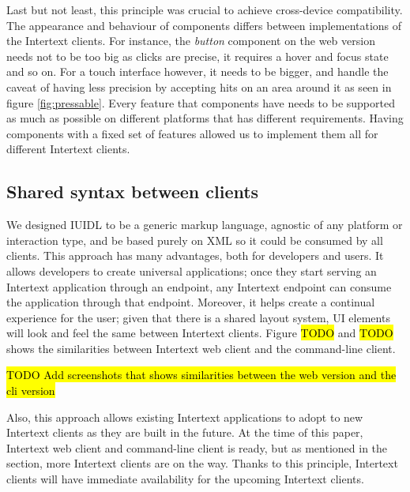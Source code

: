Last but not least, this principle was crucial to achieve cross-device compatibility. The appearance and behaviour of components differs between implementations of the Intertext clients. For instance, the \textit{button} component on the web version needs not to be too big as clicks are precise, it requires a hover and focus state and so on. For a touch interface however, it needs to be bigger, and handle the caveat of having less precision by accepting hits on an area around it as seen in figure \ref{fig:pressable}. Every feature that components have needs to be supported as much as possible on different platforms that has different requirements. Having components with a fixed set of features allowed us to implement them all for different Intertext clients.

\subsection{Shared syntax between clients}

We designed IUIDL to be a generic markup language, agnostic of any platform or interaction type, and be based purely on XML so it could be consumed by all clients. This approach has many advantages, both for developers and users. It allows developers to create universal applications; once they start serving an Intertext application through an endpoint, any Intertext endpoint can consume the application through that endpoint. Moreover, it helps create a continual experience for the user; given that there is a shared layout system, UI elements will look and feel the same between Intertext clients. Figure \hl{TODO} and \hl{TODO} shows the similarities between Intertext web client and the command-line client.

\hl{TODO Add screenshots that shows similarities between the web version and the cli version}

Also, this approach allows existing Intertext applications to adopt to new Intertext clients as they are built in the future. At the time of this paper, Intertext web client and command-line client is ready, but as mentioned in the  section, more Intertext clients are on the way. Thanks to this principle, Intertext clients will have immediate availability for the upcoming Intertext clients.
